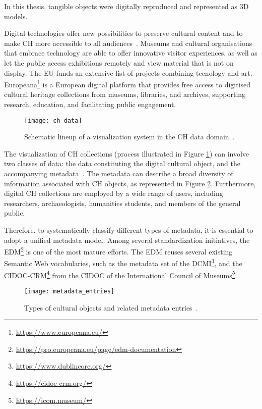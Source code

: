 In this thesis, tangible objects were digitally reproduced and represented as \gls{3D} models.

Digital technologies offer new possibilities to preserve cultural content and to make \gls{CH} more accessible to all audiences~\cite{eu_digital_heritage}. Museums and cultural organisations that embrace technology are able to offer innovative visitor experiences, as well as let the public access exhibitions remotely and view material that is not on display.
The \gls{EU} funds an extensive list of projects combining tecnology and art.
Europeana\footnote{\url{https://www.europeana.eu/}} is a European digital platform that provides free access to digitised cultural heritage collections from museums, libraries, and archives, supporting research, education, and facilitating public engagement.


\begin{figure}[h!]
    \centering
    \texttt{[image: ch\_data]}
    \caption{Schematic lineup of a visualization system in the CH data domain~\cite{Windhager2019Visualization}.}
    \label{fig:ch_data}
\end{figure}
\FloatBarrier

The visualization of \gls{CH} collections (process illustrated in Figure \ref{fig:ch_data}) can involve two classes of data: the data constituting the digital cultural object, and
the accompanying metadata~\cite{Windhager2019Visualization}.
The metadata can describe a broad diversity of information associated
with \gls{CH} objects, as represented in Figure \ref{fig:ch_objects}.
Furthermore, digital \gls{CH} collections are employed by a wide range of users, including researchers, archaeologists, humanities students, and members of the general public.

Therefore, to systematically classify different types of metadata, it is essential to adopt a unified metadata model. 
Among several standardization initiatives, the \gls{EDM}\footnote{\url{https://pro.europeana.eu/page/edm-documentation}} is one of the most mature efforts. 
The \gls{EDM} reuses several existing Semantic Web vocabularies, such as the metadata set of the \gls{DCMI}\footnote{\url{https://www.dublincore.org/}}, and the
\gls{CIDOC-CRM}\footnote{\url{https://cidoc-crm.org/}} from the \gls{CIDOC} of the International Council of Museums\footnote{\url{https://icom.museum/}}. 


\begin{figure}[h!]
    \centering
    \texttt{[image: metadata\_entries]}
    \caption{Types of cultural objects and related metadata entries~\cite{Windhager2019Visualization}.}
    \label{fig:ch_objects}
\end{figure}
\FloatBarrier



